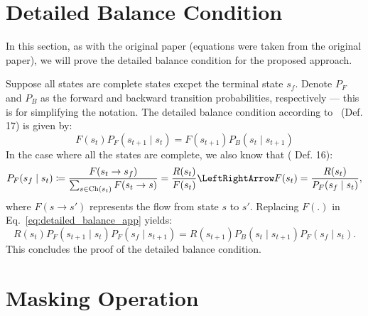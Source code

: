 \documentclass{lxaiproposal}
\begin{document}
\begin{table}[h]
        \pagebreak
        \newpage
        \clearpage
        
        

        \makeappendix

        \appendix

        \renewcommand\theequation{\thesection\arabic{equation}}


        \section{Detailed Balance Condition}\label{app:detailed_balance}
        \vspace*{-3mm}

        In this section, as with the original paper (equations were taken from the original paper), we will prove the detailed balance condition
        for the proposed approach.

        Suppose all states are complete states excpet the terminal state $s_f$. Denote $P_F$ and $P_B$ as the forward
        and backward transition probabilities, respectively --- this is for simplifying the notation. The detailed balance
        condition according to~\cite{bengio2023gflownetfoundations} (Def. 17) is given by:
        \begin{equation}
            F(s_t)P_F(s_{t+1} \mid s_t) = F(s_{t+1})P_B(s_t \mid s_{t+1})
            \label{eq:detailed_balance_app}
        \end{equation}
        In the case where all the states are complete, we also know that (\cite{bengio2023gflownetfoundations} Def. 16):
        \[
            P_F(s_f \mid s_t) \coloneq \frac{F(s_t \to s_f)}{\sum_{s \in \text{Ch}(s_t)} F(s_t \to s)} = \frac{R(s_t)}{F(s_t)}
            \LeftRightArrow F(s_t) = \frac{R(s_t)}{P_F(s_f \mid s_t)},
        \]
        where $F(s \to s')$ represents the flow from state $s$ to  $s'$. Replacing $F(.)$ in Eq.~\eqref{eq:detailed_balance_app}
        yields:
        \begin{equation}
            R(s_t)P_F(s_{t+1} \mid s_t)P_F(s_f \mid s_{t+1}) = R(s_{t+1})P_B(s_t \mid s_{t+1})P_F(s_f \mid s_t).
            \label{eq:detailed_balance_app2}
        \end{equation}
        This concludes the proof of the detailed balance condition.


        \section{Masking Operation}\label{app:masking}
        \vspace*{-3mm}


\end{table}
\end{document}
